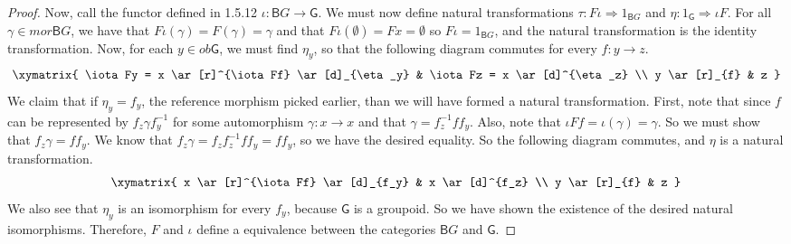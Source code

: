 \documentclass[main.tex]{subfiles}
\begin{document}
\begin{proof}
	Now, call the functor defined in 1.5.12  $\iota\colon \textsf{B}G \rightarrow
	\textsf{G}$. We must now define natural transformations $\tau\colon F\iota
	\Rightarrow 1_{\textsf{B}G} $ and $\eta\colon 1_{\textsf{G}}\Rightarrow \iota F$.
	For all $\gamma \in mor\textsf{B}G$, we have that $F\iota(\gamma) =
	F(\gamma) = \gamma$ and that $F\iota(\emptyset) = Fx = \emptyset$ so $F\iota
	= 1_{\textsf{B}G}$, and the natural transformation is the identity
	transformation. Now, for each $y \in ob\textsf{G}$, we must find $\eta_y$,
	so that the following diagram commutes for every $f\colon y \rightarrow z$.
	\[\xymatrix{
			\iota Fy = x
			\ar[r]^{\iota Ff}
			\ar[d]_{\eta_y}
			& \iota Fz = x
			\ar[d]^{\eta_z}
			\\
			y
			\ar[r]_{f}
			& z
	}\]
	We claim that if $\eta_y = f_y$, the reference morphism picked earlier, than
	we will have formed a natural transformation. First, note that since $f$ can
	be represented by $f_z\gamma f_y^{-1}$ for some automorphism $\gamma\colon x
	\rightarrow x$ and that $\gamma = f_z^{-1}ff_y$. Also, note that $\iota Ff =
	\iota(\gamma) = \gamma$. So we must show that $f_z\gamma = ff_y$. We know
	that $f_z\gamma = f_zf_z^{-1}ff_y = ff_y$, so we have the desired equality.
	So the following diagram commutes, and $\eta$ is a natural transformation.
	\begin{align}
		\xymatrix{
			x
			\ar[r]^{\iota Ff}
			\ar[d]_{f_y}
			&  x
			\ar[d]^{f_z}
			\\
			y
			\ar[r]_{f}
			& z
		}
	\end{align}
	We also see that $\eta_y$ is an isomorphism for every $f_y$, because
	$\textsf{G}$ is a groupoid. So we have shown the existence of the desired
	natural isomorphisms. Therefore, $F$ and $\iota$ define a equivalence
	between  the categories $\textsf{B}G$ and $\textsf{G}$.
\end{proof}
\end{document}
